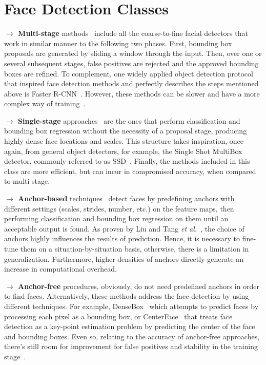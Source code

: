 \documentclass[class=report, crop=false, a4paper, 12pt]{standalone}
\begin{document}
\label{sec:face_detection_appendix}
\section*{Face Detection Classes}

\noindent\textbf{$\rightarrow$ Multi-stage} methods~\autocite{dengRetinaFaceSinglestageDense2019} include all the coarse-to-fine facial detectors that work in similar manner to the following two phases. First, bounding box proposals are generated by sliding a window through the input. Then, over one or several subsequent stages, false positives are rejected and the approved bounding boxes are refined. To complement, one widely applied object detection protocol that inspired face detection methods and perfectly describes the steps mentioned above is Faster R-CNN~\autocite{renFasterRCNNRealTime2016}. However, these methods can be slower and have a more complex way of training~\autocite{xuCenterFaceJointFace2019}.

\vspace{0.7\baselineskip}
\noindent\textbf{$\rightarrow$ Single-stage} approaches~\autocite{dengRetinaFaceSinglestageDense2019} are the ones that perform classification and bounding box regression without the necessity of a proposal stage, producing highly dense face locations and scales. This structure takes inspiration, once again, from general object detectors, for example, the Single Shot MultiBox detector, commonly referred to as SSD~\autocite{liuSSDSingleShot2016}. Finally, the methods included in this class are more efficient, but can incur in compromised accuracy, when compared to multi-stage.

\vspace{0.7\baselineskip}
\noindent\textbf{$\rightarrow$ Anchor-based} techniques~\autocite{liuHAMBoxDelvingOnline2019, dengRetinaFaceSinglestageDense2019, zhangFaceDetectionUsing2018} detect faces by predefining anchors with different settings (scales, strides, number, etc.) on the feature maps, then performing classification and bounding box regression on them until an acceptable output is found. As proven by Liu and Tang \textit{et al.}~\autocite{liuHAMBoxDelvingOnline2019}, the choice of anchors highly influences the results of prediction. Hence, it is necessary to fine-tune them on a situation-by-situation basis, otherwise, there is a limitation in generalization. Furthermore, higher densities of anchors directly generate an increase in computational overhead.

\vspace{0.7\baselineskip}
\noindent\textbf{$\rightarrow$ Anchor-free} procedures, obviously, do not need predefined anchors in order to find faces. Alternatively, these methods address the face detection by using different techniques. For example, DenseBox~\autocite{huangDenseBoxUnifyingLandmark2015} which attempts to predict faces by processing each pixel as a bounding box, or CenterFace~\autocite{xuCenterFaceJointFace2019} that treats face detection as a key-point estimation problem by predicting the center of the face and bounding boxes. Even so, relating to the accuracy of anchor-free approaches, there's still room for improvement for false positives and stability in the training stage~\autocite{duElementsEndtoendDeep2022}.
\end{document}
